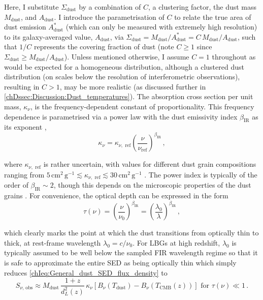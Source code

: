 Here, I substitute $\Sigma_\text{dust}$ by a combination of $C$, a clustering factor, the dust mass $M_\text{dust}$, and $A_\text{dust}$. I introduce the parametrisation of $C$ to relate the true area of dust emission $A_\text{dust}^*$ (which can only be measured with extremely high resolution) to its galaxy-averaged value, $A_\text{dust}$, via $\Sigma_\text{dust} = M_\text{dust} / A_\text{dust}^* = C \, M_\text{dust} / A_\text{dust}$, such that $1/C$ represents the covering fraction of dust (note $C \geq 1$ since $\Sigma_\text{dust} \geq M_\text{dust} / A_\text{dust}$). Unless mentioned otherwise, I assume $C = 1$ throughout as would be expected for a homogeneous distribution, although a clustered dust distribution (on scales below the resolution of interferometric observations), resulting in $C > 1$, may be more realistic (as discussed further in \cref{chDssec:Discussion:Dust_temperatures}). The absorption cross section per unit mass, $\kappa_\nu$, is the frequency-dependent constant of proportionality. This frequency dependence is parametrised via a power law with the dust emissivity index $\beta_\text{IR}$ as its exponent \citep{2006ApJ...636.1114D},
\begin{equation}
    \label{chIeq:Dust_mass_absorption_coefficient_form}
    \kappa_\nu = \kappa_{\nu, \text{ ref}} \left( \frac{\nu}{\nu_\text{ref}} \right)^{\beta_\text{IR}} \, ,
\end{equation}

\noindent where $\kappa_{\nu, \text{ ref}}$ is rather uncertain, with values for different dust grain compositions ranging from $5 \, \mathrm{cm^2 \, g^{-1}} \lesssim \kappa_{\nu, \text{ ref}} \lesssim 30 \, \mathrm{cm^2 \, g^{-1}}$ \citep[see][, and references therein]{2014MNRAS.443.1704H}. The power index is typically of the order of $\beta_\text{IR} \sim 2$, though this depends on the microscopic properties of the dust grains \citep{2013A&A...560A..91J}. For convenience, the optical depth can be expressed in the form
\begin{equation}
    \label{chIeq:Optical_depth}
    \tau (\nu) = \left( \frac{\nu}{\nu_0} \right)^{\beta_\text{IR}} = \left( \frac{\lambda_0}{\lambda} \right)^{\beta_\text{IR}} \, ,
\end{equation}

\noindent which clearly marks the point at which the dust transitions from optically thin to thick, at rest-frame wavelength $\lambda_0 = c/\nu_0$. For LBGs at high redshift, $\lambda_0$ is typically assumed to be well below the sampled FIR wavelength regime so that it is safe to approximate the entire SED as being optically thin \citep[e.g.][]{2021MNRAS.508L..58B} which simply reduces \cref{chIeq:General_dust_SED_flux_density} to
\begin{equation}
    \label{chIeq:OT_dust_SED_flux_density}
    S_{\nu, \, \text{obs}} \approx M_\text{dust} \, \frac{1+z}{d_L^2 (z)} \, \kappa_\nu \left[ B_\nu \left(T_\text{dust} \right) - B_\nu \left(T_\text{CMB} (z) \right) \right] \text{ for } \tau (\nu) \ll 1 \, .
\end{equation}

